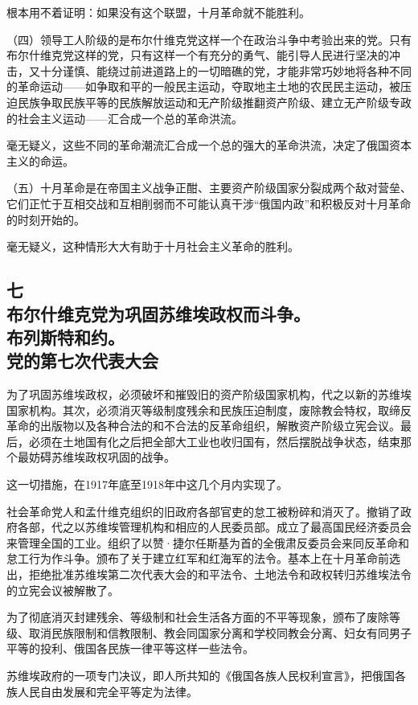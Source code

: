 根本用不着证明：如果没有这个联盟，十月革命就不能胜利。

（四）领导工人阶级的是布尔什维克党这样一个在政治斗争中考验出来的党。只有布尔什维克党这样的党，只有这样一个有充分的勇气、能引导人民进行坚决的冲击，又十分谨慎、能绕过前进道路上的一切暗礁的党，才能非常巧妙地将各种不同的革命运动——如争取和平的一般民主运动，夺取地主土地的农民民主运动，被压迫民族争取民族平等的民族解放运动和无产阶级推翻资产阶级、建立无产阶级专政的社会主义运动——汇合成一个总的革命洪流。

毫无疑义，这些不同的革命潮流汇合成一个总的强大的革命洪流，决定了俄国资本主义的命运。

（五）十月革命是在帝国主义战争正酣、主要资产阶级国家分裂成两个敌对营垒、它们正忙于互相交战和互相削弱而不可能认真干涉“俄国内政”和积极反对十月革命的时刻开始的。

毫无疑义，这种情形大大有助于十月社会主义革命的胜利。


\subsection[七\q 布尔什维克党为巩固苏维埃政权而斗争。布列斯特和约。党的第七次代表大会]{七\\ 布尔什维克党为巩固苏维埃政权而斗争。\\布列斯特和约。\\党的第七次代表大会}

为了巩固苏维埃政权，必须破坏和摧毁旧的资产阶级国家机构，代之以新的苏维埃国家机构。其次，必须消灭等级制度残余和民族压迫制度，废除教会特权，取缔反革命的出版物以及各种合法的和不合法的反革命组织，解散资产阶级立宪会议。最后，必须在土地国有化之后把全部大工业也收归国有，然后摆脱战争状态，结束那个最妨碍苏维埃政权巩固的战争。

这一切措施，在1917年底至1918年中这几个月内实现了。

社会革命党人和孟什维克组织的旧政府各部官吏的怠工被粉碎和消灭了。撤销了政府各部，代之以苏维埃管理机构和相应的人民委员部。成立了最高国民经济委员会来管理全国的工业。组织了以赞·捷尔任斯基为首的全俄肃反委员会来同反革命和怠工行为作斗争。颁布了关于建立红军和红海军的法令。基本上在十月革命前选出，拒绝批准苏维埃第二次代表大会的和平法令、土地法令和政权转归苏维埃法令的立宪会议被解散了。

为了彻底消灭封建残余、等级制和社会生活各方面的不平等现象，颁布了废除等级、取消民族限制和信教限制、教会同国家分离和学校同教会分离、妇女有同男子平等的投利、俄国各民族一律平等这样一些法令。

苏维埃政府的一项专门决议，即人所共知的《俄国各族人民权利宣言》，把俄国各族人民自由发展和完全平等定为法律。

